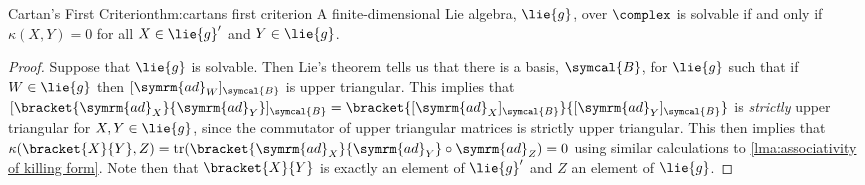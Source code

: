 \documentclass[fleqn]{NotesClass}
\DeclareMathOperator{\tr}{tr}
\newcommand{\ad}{\symrm{ad}}
\newcommand{\basis}{\symcal{B}}
\begin{document}
    \begin{thm}{Cartan's First Criterion}{thm:cartans first criterion}
        A finite-dimensional Lie algebra, \(\lie{g}\), over \(\complex\) is solvable if and only if \(\kappa(X, Y) = 0\) for all \(X \in \lie{g}'\) and \(Y \in \lie{g}\).
        \begin{proof}
            Suppose that \(\lie{g}\) is solvable.
            Then Lie's theorem tells us that there is a basis, \(\basis\), for \(\lie{g}\) such that if \(W \in \lie{g}\) then \([\ad_W]_{\basis}\) is upper triangular.
            This implies that \([\bracket{\ad_X}{\ad_Y}]_{\basis} = \bracket{[\ad_X]_{\basis}}{[\ad_Y]_{\basis}}\) is \emph{strictly} upper triangular for \(X, Y \in \lie{g}\), since the commutator of upper triangular matrices is strictly upper triangular.
            This then implies that \(\kappa(\bracket{X}{Y}, Z) = \tr(\bracket{\ad_X}{\ad_Y}\circ \ad_Z) = 0\) using similar calculations to \cref{lma:associativity of killing form}.
            Note then that \(\bracket{X}{Y}\) is exactly an element of \(\lie{g}'\) and \(Z\) an element of \(\lie{g}\).
            

\end{proof}
\end{thm}
\end{document}
